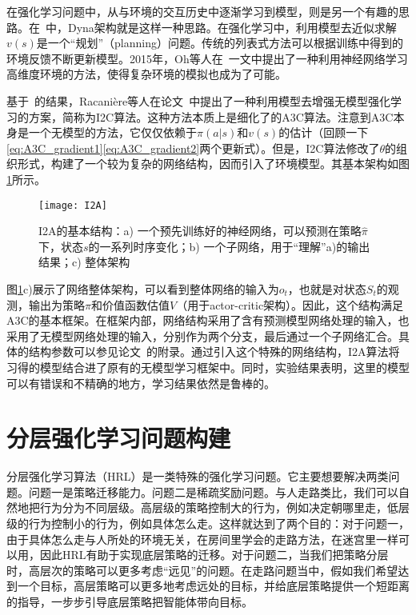       在强化学习问题中，从与环境的交互历史中逐渐学习到模型，则是另一个有趣的思路。在~\cite{Sutton_book}中，Dyna架构就是这样一种思路。在强化学习中，利用模型去近似求解$v(s)$是一个``规划''（planning）问题。传统的列表式方法可以根据训练中得到的环境反馈不断更新模型。2015年，Oh等人在~\cite{action-conditional_prediction}一文中提出了一种利用神经网络学习高维度环境的方法，使得复杂环境的模拟也成为了可能。\par 
      基于~\cite{action-conditional_prediction}的结果，Racani\`{e}re等人在论文~\cite{I2A}中提出了一种利用模型去增强无模型强化学习的方案，简称为I2C算法。这种方法本质上是细化了的A3C算法。注意到A3C本身是一个无模型的方法，它仅仅依赖于$\pi(a|s)$和$v(s)$的估计（回顾一下\eqref{eq:A3C_gradient1}\eqref{eq:A3C_gradient2}两个更新式）。但是，I2C算法修改了$\theta$的组织形式，构建了一个较为复杂的网络结构，因而引入了环境模型。其基本架构如图\ref{fig:I2A}所示。
      \begin{figure}[H] %
        \centering
        \texttt{[image: I2A]}
        \caption{I2A的基本结构：a) 一个预先训练好的神经网络，可以预测在策略$\hat{\pi}$下，状态$s$的一系列时序变化；b) 一个子网络，用于``理解''a)的输出结果；c) 整体架构}
        \label{fig:I2A}
      \end{figure}
      \par 图\ref{fig:I2A}c)展示了网络整体架构，可以看到整体网络的输入为$o_t$，也就是对状态$S_t$的观测，输出为策略$\pi$和价值函数估值$V$（用于actor-critic架构）。因此，这个结构满足A3C的基本框架。在框架内部，网络结构采用了含有预测模型网络处理的输入，也采用了无模型网络处理的输入，分别作为两个分支，最后通过一个子网络汇合。具体的结构参数可以参见论文~\cite{I2A}的附录。通过引入这个特殊的网络结构，I2A算法将习得的模型结合进了原有的无模型学习框架中。同时，实验结果表明，这里的模型可以有错误和不精确的地方，学习结果依然是鲁棒的。
    
\section{分层强化学习问题构建}
分层强化学习算法（HRL）是一类特殊的强化学习问题。它主要想要解决两类问题。问题一是策略迁移能力。问题二是稀疏奖励问题。与人走路类比，我们可以自然地把行为分为不同层级。高层级的策略控制大的行为，例如决定朝哪里走，低层级的行为控制小的行为，例如具体怎么走。这样就达到了两个目的：对于问题一，由于具体怎么走与人所处的环境无关，在房间里学会的走路方法，在迷宫里一样可以用，因此HRL有助于实现底层策略的迁移。对于问题二，当我们把策略分层时，高层次的策略可以更多考虑``远见''的问题。在走路问题当中，假如我们希望达到一个目标，高层策略可以更多地考虑远处的目标，并给底层策略提供一个短距离的指导，一步步引导底层策略把智能体带向目标。

